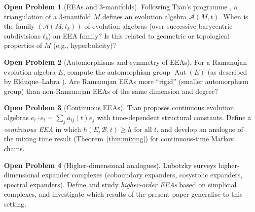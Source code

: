 \documentclass[12pt,a4paper]{amsart}
\theoremstyle{definition}
\newtheorem{problem}{Open Problem}
\DeclareMathOperator{\Aut}{Aut}
\newcommand{\hh}{h}          %
\newcommand{\EA}{E}          %
\newcommand{\natbasis}{\mathcal{B}}  %
\begin{document}
\begin{problem}[EEAs and 3-manifolds]
\label{op:3manifold}
Following Tian's programme \cite[Section~6.2.6]{Tian2008}, a
triangulation of a 3-manifold $M$ defines an evolution algebra
$\mathcal{A}(M,t)$.  When is the family $(\mathcal{A}(M,t_k))$ of
evolution algebras (over successive barycentric subdivisions $t_k$) an
EEA family?  Is this related to geometric or topological properties of
$M$ (e.g., hyperbolicity)?
\end{problem}

\begin{problem}[Automorphisms and symmetry of EEAs]
\label{op:aut}
For a Ramanujan evolution algebra $\EA$, compute the automorphism group
$\Aut(\EA)$ (as described by Elduque--Labra \cite{ElduqueLabra2019}).
Are Ramanujan EEAs more ``rigid'' (smaller automorphism group) than
non-Ramanujan EEAs of the same dimension and degree?
\end{problem}

\begin{problem}[Continuous EEAs]
\label{op:continuous}
Tian \cite[Section~6.2.4]{Tian2008} proposes continuous evolution
algebras $e_i\cdot e_i=\sum_j a_{ij}(t)e_j$ with time-dependent
structural constants.  Define a \emph{continuous EEA} in which
$\hh(\EA,\natbasis,t)\ge h$ for all $t$, and develop an analogue of
the mixing time result (Theorem~\ref{thm:mixing}) for continuous-time
Markov chains.
\end{problem}

\begin{problem}[Higher-dimensional analogues]
\label{op:higher}
Lubotzky \cite{Lubotzky2014} surveys higher-dimensional expander
complexes (coboundary expanders, cosystolic expanders, spectral
expanders).  Define and study \emph{higher-order EEAs} based on
simplicial complexes, and investigate which results of the present
paper generalise to this setting.
\end{problem}

\end{document}
